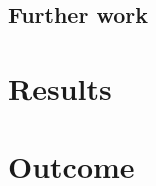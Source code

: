 \documentclass{report}
\begin{document}
\section{Further work}


\chapter{Results}
\label{chap:results}

\chapter{Outcome}
\label{chap:outcome}



\end{document}
